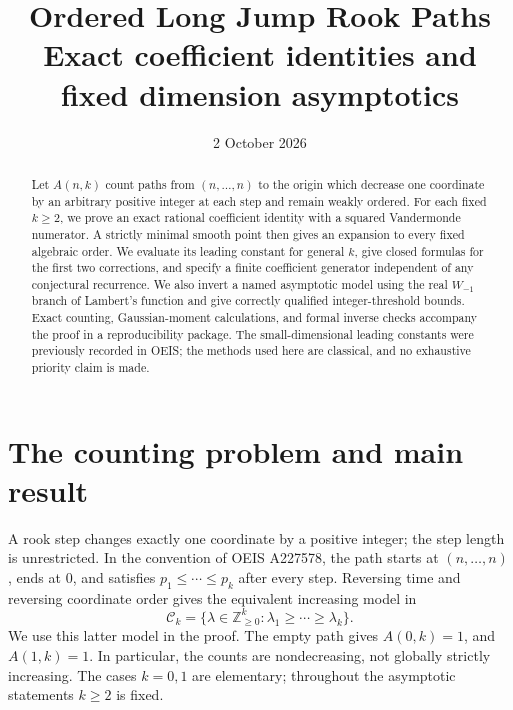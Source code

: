 \documentclass[11pt]{article}
\title{Ordered Long Jump Rook Paths\\[4pt]\large Exact coefficient identities and fixed dimension asymptotics}
\author{}
\date{2 October 2026}
\theoremstyle{remark}\newtheorem{remark}[theorem]{Remark}
\begin{document}
\maketitle
\begin{abstract}
Let $A(n,k)$ count paths from $(n,\ldots,n)$ to the origin which decrease one coordinate by an arbitrary positive integer at each step and remain weakly ordered. For each fixed $k\ge2$, we prove an exact rational coefficient identity with a squared Vandermonde numerator. A strictly minimal smooth point then gives an expansion to every fixed algebraic order. We evaluate its leading constant for general $k$, give closed formulas for the first two corrections, and specify a finite coefficient generator independent of any conjectural recurrence. We also invert a named asymptotic model using the real $W_{-1}$ branch of Lambert's function and give correctly qualified integer-threshold bounds. Exact counting, Gaussian-moment calculations, and formal inverse checks accompany the proof in a reproducibility package. The small-dimensional leading constants were previously recorded in OEIS; the methods used here are classical, and no exhaustive priority claim is made.
\end{abstract}
\setcounter{tocdepth}{1}
\tableofcontents
\clearpage

\section{The counting problem and main result}\label{orp:sec:problem}
A rook step changes exactly one coordinate by a positive integer; the step length is unrestricted. In the convention of OEIS A227578, the path starts at $(n,\ldots,n)$, ends at $0$, and satisfies $p_1\le\cdots\le p_k$ after every step. Reversing time and reversing coordinate order gives the equivalent increasing model in
\[
\mathcal C_k=\{\lambda\in\mathbb Z_{\ge0}^k:\lambda_1\ge\cdots\ge\lambda_k\}.
\]
We use this latter model in the proof. The empty path gives $A(0,k)=1$, and $A(1,k)=1$. In particular, the counts are nondecreasing, not globally strictly increasing. The cases $k=0,1$ are elementary; throughout the asymptotic statements $k\ge2$ is fixed.
\end{document}
